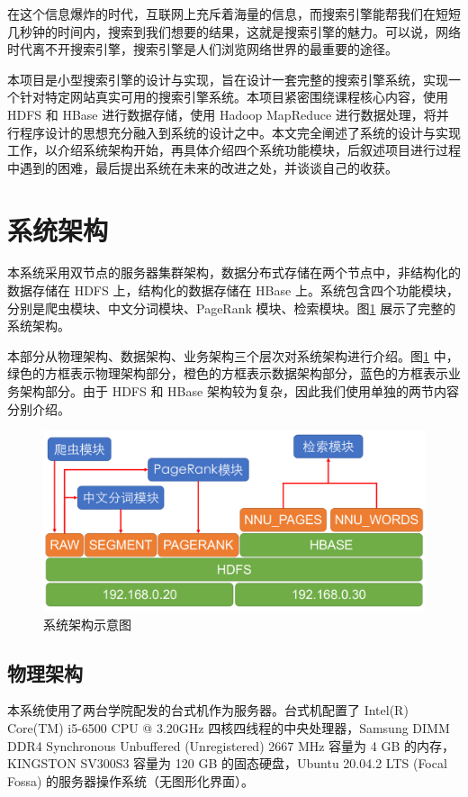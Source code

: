 \documentclass{ctexart}
\begin{document}
    在这个信息爆炸的时代，互联网上充斥着海量的信息，而搜索引擎能帮我们在短短几秒钟的时间内，搜索到我们想要的结果，这就是搜索引擎的魅力。可以说，网络时代离不开搜索引擎，搜索引擎是人们浏览网络世界的最重要的途径。

    本项目是小型搜索引擎的设计与实现，旨在设计一套完整的搜索引擎系统，实现一个针对特定网站真实可用的搜索引擎系统。本项目紧密围绕课程核心内容，使用 HDFS 和 HBase 进行数据存储，使用 Hadoop MapReduce 进行数据处理，将并行程序设计的思想充分融入到系统的设计之中。本文完全阐述了系统的设计与实现工作，以介绍系统架构开始，再具体介绍四个系统功能模块，后叙述项目进行过程中遇到的困难，最后提出系统在未来的改进之处，并谈谈自己的收获。


    \section{系统架构}\label{sec:archicture}

    本系统采用双节点的服务器集群架构，数据分布式存储在两个节点中，非结构化的数据存储在 HDFS 上，结构化的数据存储在 HBase 上。系统包含四个功能模块，分别是爬虫模块、中文分词模块、PageRank 模块、检索模块。图\ref{fig:archicture} 展示了完整的系统架构。

    本部分从物理架构、数据架构、业务架构三个层次对系统架构进行介绍。图\ref{fig:archicture} 中，绿色的方框表示物理架构部分，橙色的方框表示数据架构部分，蓝色的方框表示业务架构部分。由于 HDFS 和 HBase 架构较为复杂，因此我们使用单独的两节内容分别介绍。

    \begin{figure}[t]
        \centering
        \includegraphics[width=\textwidth]{src/archicture}
        \caption{系统架构示意图}
        \label{fig:archicture}
    \end{figure}

    \subsection{物理架构}\label{subsec:archicture_physics}
    本系统使用了两台学院配发的台式机作为服务器。台式机配置了 Intel(R) Core(TM) i5-6500 CPU @ 3.20GHz 四核四线程的中央处理器，Samsung DIMM DDR4 Synchronous Unbuffered (Unregistered) 2667 MHz 容量为 4 GB 的内存，KINGSTON SV300S3 容量为 120 GB 的固态硬盘，Ubuntu 20.04.2 LTS (Focal Fossa) 的服务器操作系统（无图形化界面）。
\end{document}
